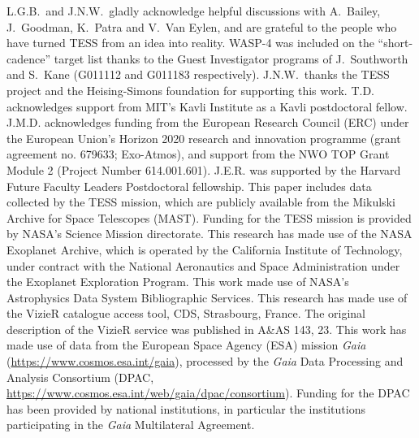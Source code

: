 \documentclass[12pt,twocolumn,tighten]{aastex62}
\begin{document}
\acknowledgements
L.G.B.\ and J.N.W.\ gladly acknowledge helpful discussions with
A.~Bailey, J.~Goodman, K.~Patra and V.~Van Eylen, and are
grateful to the people who have turned TESS from an idea into reality.
%
WASP-4 was included on the ``short-cadence'' target list thanks to the
Guest Investigator programs of J.\ Southworth and S.\ Kane (G011112
and G011183 respectively). 
%
J.N.W.\ thanks the TESS project and the Heising-Simons foundation for
supporting this work.
%
T.D. acknowledges support from MIT's Kavli Institute as a Kavli
postdoctoral fellow.
%
J.M.D. acknowledges funding from the European Research Council (ERC)
under the European Union's Horizon 2020 research and innovation
programme (grant agreement no. 679633; Exo-Atmos), and support from
the NWO TOP Grant Module 2 (Project Number 614.001.601).
%
J.E.R. was supported by the Harvard Future Faculty Leaders
Postdoctoral fellowship.
%
This paper includes data collected by the TESS mission, which are
publicly available from the Mikulski Archive for Space Telescopes
(MAST).
%
Funding for the TESS mission is provided by NASA's Science Mission
directorate.
%
This research has made use of the NASA Exoplanet Archive, which is
operated by the California Institute of Technology, under contract
with the National Aeronautics and Space Administration under the
Exoplanet Exploration Program.
%
This work made use of NASA's Astrophysics Data System Bibliographic
Services.
%
This research has made use of the VizieR catalogue access tool, CDS,
Strasbourg, France. The original description of the VizieR service was
published in A\&AS 143, 23.
%
This work has made use of data from the European Space Agency (ESA)
mission {\it Gaia} (\url{https://www.cosmos.esa.int/gaia}), processed
by the {\it Gaia} Data Processing and Analysis Consortium (DPAC,
\url{https://www.cosmos.esa.int/web/gaia/dpac/consortium}). Funding
for the DPAC has been provided by national institutions, in particular
the institutions participating in the {\it Gaia} Multilateral
Agreement.
%
\newline
%
%
\end{document}
